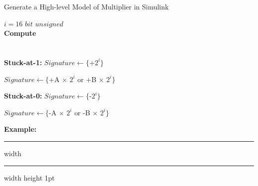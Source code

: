 \begin{algorithm}
\caption{Generate a High-level Model of  Multiplier in Simulink}
\begin{algorithmic}
\label{algo-mull}
\REQUIRE $ i = 16$  $bit$ $unsigned$ \\
\textbf{Compute}\\ 
\hspace{1.5cm}{$Original =  A $ $ \times $ $ B$ } \\
\hspace{1.5cm}{$Faulty =  A $ $ \times $ $ B$ } \\
\vspace{0.20 cm }
\textbf{Stuck-at-1:}
\vspace{0.20 cm }
\vspace{0.10 cm }
\STATE $Signature \leftarrow  \{$+$ 2^{i}\}$
\vspace{0.10 cm }
\vspace{0.20 cm }

\vspace{0.10 cm }
\STATE $Signature \leftarrow  \{$+$  $A$ $ $ \times $ $2^{i} $ $ $or$ $ $ $+$ $B$ $ $ \times $ $2^{i}\}$

\vspace{0.10 cm }
\ENDIF
\vspace{0.20 cm }
\vspace{0.20 cm }
\textbf{Stuck-at-0:}
\vspace{0.20 cm }
\vspace{0.10 cm }
\STATE $Signature \leftarrow  \{$-$ 2^{i}\}$
\vspace{0.10 cm }
\vspace{0.20 cm }

\vspace{0.10 cm }
\STATE $Signature \leftarrow  \{$-$  $A$ $ $ \times $ $2^{i} $ $ $or$ $ $ $-$  $B$ $ $ \times $ $2^{i}\}$
\vspace{0.10 cm }
\ENDIF
\vspace{0.20 cm }
\end{algorithmic}
\end{algorithm}



\hspace{-0.3 cm}\textbf{Example:}
\hrule height 2pt width \hsize \kern 1pt \hrule width \hsize height 1pt

